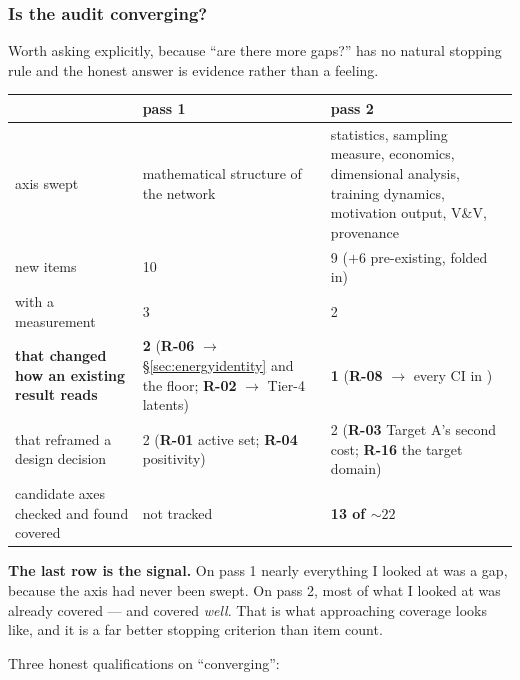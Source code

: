\subsubsection{Is the audit converging?}
\label{sec:converging}

Worth asking explicitly, because ``are there more gaps?'' has no natural
stopping rule and the honest answer is evidence rather than a feeling.

\begin{center}
\begin{tabularx}{\textwidth}{@{}L{4.2cm} Y Y@{}}
\toprule
 & \textbf{pass 1} & \textbf{pass 2} \\
\midrule
axis swept & mathematical structure of the network &
  statistics, sampling measure, economics, dimensional analysis, training
  dynamics, motivation output, V\&V, provenance \\
new items & 10 & 9 ($+6$ pre-existing, folded in) \\
with a measurement & 3 & 2 \\
\textbf{that changed how an existing result reads} &
  \textbf{2} (\textbf{R-06} $\to$ \S\ref{sec:energyidentity} and the \kap{}
  floor; \textbf{R-02} $\to$ Tier-4 latents) &
  \textbf{1} (\textbf{R-08} $\to$ every CI in ) \\
that reframed a design decision &
  2 (\textbf{R-01} active set; \textbf{R-04} positivity) &
  2 (\textbf{R-03} Target A's second cost; \textbf{R-16} the target domain) \\
candidate axes checked and found covered & not tracked &
  \textbf{13 of ${\sim}22$} \\
\bottomrule
\end{tabularx}
\end{center}

\textbf{The last row is the signal.} On pass 1 nearly everything I looked at was
a gap, because the axis had never been swept. On pass 2, most of what I looked
at was already covered --- and covered \emph{well}. That is what approaching
coverage looks like, and it is a far better stopping criterion than item count.

Three honest qualifications on ``converging'':

